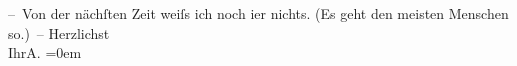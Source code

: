 \begin{ledgroupsized}[t]{13cm}
           \pstart
           – Von der nächſten Zeit weiſs ich noch i{\geminationm}er nichts. (Es geht den meisten Menschen so.) –\pend
           \pstart
           Herzlichst{\\[\baselineskip]}Ihr\spacefill\mbox{A.}\pend
           \leftskip=0em{}\endnumbering{}\end{ledgroupsized}  \newcommand{\dateiname}{L01055}\newcommand{\titel}{Arthur Schnitzler an Richard Beer-Hofmann, 15. 7. 1900}\newcommand{\editorInnen}{Martin Anton Müller und Gerd-Hermann Susen}
      